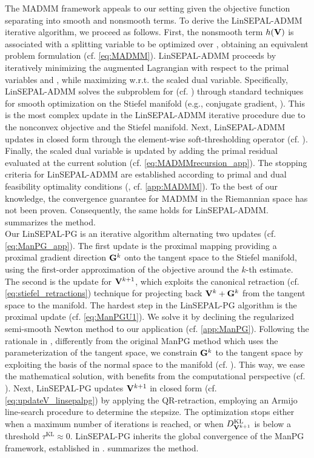  The MADMM framework appeals to our setting given the objective function separating into smooth and nonsmooth terms.
To derive the LinSEPAL-ADMM iterative algorithm, we proceed as follows.
First, the nonsmooth term $h(\mathbf{V})$ is associated with a splitting variable \Y to be optimized over \rmatdim, obtaining an equivalent problem formulation (cf. \cref{eq:MADMM}). LinSEPAL-ADMM proceeds by iteratively minimizing the augmented Lagrangian with respect to the primal variables \V and \Y, while maximizing w.r.t. the scaled dual variable. 
Specifically, LinSEPAL-ADMM solves the subproblem for \V (cf. ) through standard techniques for smooth optimization on the Stiefel manifold (e.g., conjugate gradient, \citealp{edelman1998geometry}).
This is the most complex update in the LinSEPAL-ADMM iterative procedure due to the nonconvex objective and the Stiefel manifold.
Next, LinSEPAL-ADMM updates \Y in closed form through the element-wise soft-thresholding operator (cf. ). Finally, the scaled dual variable is updated by adding the primal residual evaluated at the current solution (cf. \cref{eq:MADMMrecursion_app}).
The stopping criteria for LinSEPAL-ADMM are established according to primal and dual feasibility optimality conditions (\citealp{boyd2011distributed}, cf. \cref{app:MADMM}).
To the best of our knowledge, the convergence guarantee for MADMM in the Riemannian space has not been proven.
Consequently, the same holds for LinSEPAL-ADMM.
 summarizes the method.\\

 Our LinSEPAL-PG is an iterative algorithm alternating two updates (cf. \cref{eq:ManPG_app}).
The first update is the proximal mapping providing a proximal gradient direction $\mathbf{G}^k$ onto the tangent space to the Stiefel manifold, using the first-order approximation of the objective around the $k$-th estimate.
The second is the update for $\mathbf{V}^{k+1}$, which exploits the canonical retraction (cf. \cref{eq:stiefel_retractions}) technique for projecting back $\mathbf{V}^k + \mathbf{G}^k$ from the tangent space to the manifold. The hardest step in the LinSEPAL-PG algorithm is the proximal update (cf. \cref{eq:ManPGU1}).
We solve it by declining the regularized semi-smooth Newton method \cite{xiao2018regularized} to our application (cf. \cref{app:ManPG}).
Following the rationale in \cite{si2024riemannian}, differently from the original ManPG method which uses the parameterization of the tangent space, we constrain $\mathbf{G}^k$ to the tangent space by exploiting the basis of the normal space to the manifold (cf. ).
This way, we ease the mathematical solution, with benefits from the computational perspective (cf. \citealp{si2024riemannian}).
Next, LinSEPAL-PG updates $\mathbf{V}^{k+1}$ in closed form (cf. \cref{eq:updateV_linsepalpg}) by applying the QR-retraction, employing an Armijo line-search procedure to determine the stepsize.
The optimization stops either when a maximum number of iterations is reached, or when $D^{\mathrm{KL}}_{\mathbf{V}^{k+1}}$ is below a threshold $\tau^{\mathrm{KL}}\approx 0$.
LinSEPAL-PG inherits the global convergence of the ManPG framework, established in \cite{chen2020}.
 summarizes the method.

